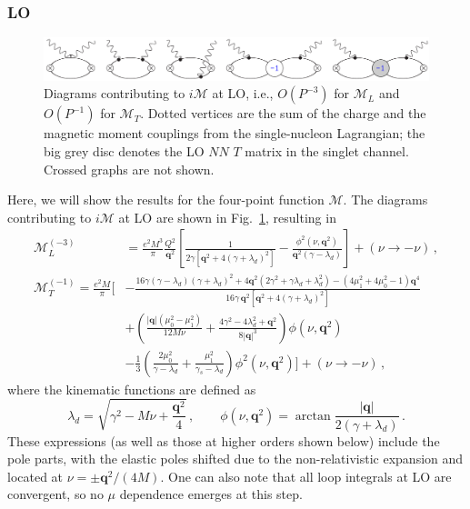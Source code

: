\documentclass[prl,
twocolumn,
showpacs,preprintnumbers,amsmath,amssymb,
superscriptaddress,
a4paper,nofootinbib,longbibliography]{revtex4-2}
\def\bv#1{\boldsymbol{#1}}
\begin{document}
\subsubsection{LO}
\begin{figure}[htb]
    \centering
    \includegraphics[width=\textwidth]{figs/VVCS_LO.pdf}
    \caption{Diagrams contributing to $i\mathcal{M}$ at LO, i.e., $O(P^{-3})$ for $\mathcal{M}_L$ and $O(P^{-1})$ for $\mathcal{M}_T$. Dotted vertices are the sum of the charge and the magnetic moment couplings from the single-nucleon Lagrangian; the big grey disc denotes the LO $NN$ $T$ matrix in the singlet channel. Crossed graphs are not shown.}
    \label{fig:LO}
\end{figure}
Here, we will show the results for the four-point function $\mathcal{M}$. The diagrams contributing to $i\mathcal{M}$ at LO are shown in Fig.~\ref{fig:LO}, resulting in
\begin{align}
\mathcal{M}_{L}^{(-3)} & = \frac{e^2M^3}{\pi}\frac{Q^2}{\bv{q}^2}\left[\frac{1}{2 \gamma  \left[\bv{q}^2+4 (\gamma +\lambda_d)^2\right]}-\frac{\phi^2(\nu,\bv{q}^2)}{\bv{q}^2 (\gamma-\lambda_d)}\right]+(\nu\to-\nu)\,,\\
\mathcal{M}_{T}^{(-1)} = \frac{e^2M}{\pi}\Bigg[& -\frac{16\gamma  (\gamma -\lambda_d) (\gamma +\lambda_d)^2+4 \bv{q}^2 \left(2 \gamma ^2+\gamma  \lambda_d+\lambda_d^2\right)-\left(4 \mu_1^2+4 \mu_0^2-1\right)\bv{q}^4 }{16 \gamma\,  \bv{q}^2
   \left[\bv{q}^2+4 (\gamma +\lambda_d)^2\right]}\nonumber\\
   &+
 \left(\frac{|\bv{q}| (\mu_0^2-\mu_1^2)}{12 M\nu}+\frac{4 \gamma ^2-4 \lambda_d^2+\bv{q}^2}{8 |\bv{q}|^3}\right)\phi(\nu,\bv{q}^2)\nonumber\\
  &
-\frac{1}{3} \left(\frac{2 \mu_0^2}{\gamma-\lambda_d}
+\frac{\mu_1^2}{\gamma_s-\lambda_d}\right)\phi^2(\nu,\bv{q}^2)
   \Bigg]+(\nu\to-\nu)\,,
\label{eq:MLO}
\end{align}
where the kinematic functions are defined as
\begin{equation}
\lambda_d=\sqrt{\gamma^2-M\nu+\frac{\bv{q}^2}{4}}\,,\qquad \phi(\nu,\bv{q}^2)=\arctan\frac{\left|\bv{q}\right|}{2(\gamma+\lambda_d)}\,.
\end{equation}
These expressions (as well as those at higher orders shown below) include the pole parts, with the elastic poles shifted due to the non-relativistic expansion and located at $\nu=\pm\bv{q}^2/(4M)$. One can also note that all loop integrals at LO are convergent, so no $\mu$ dependence emerges at this step.
\end{document}
